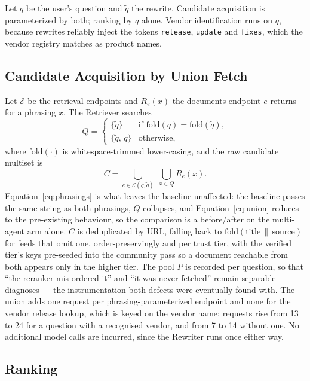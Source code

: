\documentclass[10pt,conference]{IEEEtran}
\begin{document}
Let $q$ be the user's question and $\tilde{q}$ the rewrite. Candidate
acquisition is parameterized by both; ranking by $q$ alone. Vendor
identification runs on $q$, because rewrites reliably inject the tokens
\texttt{release}, \texttt{update} and \texttt{fixes}, which the vendor registry
matches as product names.

\subsection{Candidate Acquisition by Union Fetch}\label{sec:union-fetch}

Let $\mathcal{E}$ be the retrieval endpoints and $R_e(x)$ the documents endpoint
$e$ returns for a phrasing $x$. The Retriever searches
\begin{equation}
Q = \begin{cases}
\{\tilde{q}\} & \text{if } \mathrm{fold}(q) = \mathrm{fold}(\tilde{q}),\\
\{\tilde{q},\, q\} & \text{otherwise,}
\end{cases}
\label{eq:phrasings}
\end{equation}
where $\mathrm{fold}(\cdot)$ is whitespace-trimmed lower-casing, and the raw
candidate multiset is
\begin{equation}
C = \bigcup_{e \in \mathcal{E}(q,\tilde{q})} \; \bigcup_{x \in Q} R_e(x).
\label{eq:union}
\end{equation}
Equation~\eqref{eq:phrasings} is what leaves the baseline unaffected: the
baseline passes the same string as both phrasings, $Q$ collapses, and
Equation~\eqref{eq:union} reduces to the pre-existing behaviour, so the
comparison is a before/after on the multi-agent arm alone. $C$ is deduplicated
by URL, falling back to $\mathrm{fold}(\mathrm{title} \,\|\, \mathrm{source})$
for feeds that omit one, order-preservingly and per trust tier, with the verified
tier's keys pre-seeded into the community pass so a document reachable from both
appears only in the higher tier. The pool $P$ is recorded per question, so that
``the reranker mis-ordered it'' and ``it was never fetched'' remain separable
diagnoses --- the instrumentation both defects were eventually found with. The
union adds one request per phrasing-parameterized endpoint and none for the vendor
release lookup, which is keyed on the vendor name: requests rise from 13 to 24
for a question with a recognised vendor, and from 7 to 14 without one. No
additional model calls are incurred, since the Rewriter runs once either way.

\subsection{Ranking}\label{sec:rerank}
\end{document}
